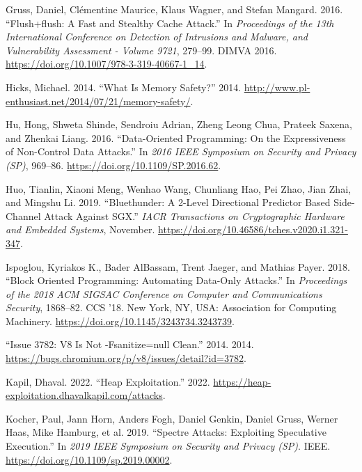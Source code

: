 \documentclass[
  a4paper,
]{report}
\newlength{\cslhangindent}
\newenvironment{CSLReferences}[2] %
{\begin{list}{}{%
	\setlength{\itemindent}{0pt}
	\setlength{\leftmargin}{0pt}
	\setlength{\parsep}{0pt}
	\ifodd #1
	\setlength{\leftmargin}{\cslhangindent}
	\setlength{\itemindent}{-1\cslhangindent}
	\fi
	\setlength{\itemsep}{#2\baselineskip}}}
{\end{list}}
\begin{document}
\begin{CSLReferences}{1}{0}
Gruss, Daniel, Clémentine Maurice, Klaus Wagner, and Stefan Mangard.
2016. {``Flush+flush: A Fast and Stealthy Cache Attack.''} In
\emph{Proceedings of the 13th International Conference on Detection of
Intrusions and Malware, and Vulnerability Assessment - Volume 9721},
279--99. DIMVA 2016. \url{https://doi.org/10.1007/978-3-319-40667-1_14}.

Hicks, Michael. 2014. {``What Is Memory Safety?''} 2014.
\url{http://www.pl-enthusiast.net/2014/07/21/memory-safety/}.

Hu, Hong, Shweta Shinde, Sendroiu Adrian, Zheng Leong Chua, Prateek
Saxena, and Zhenkai Liang. 2016. {``Data-Oriented Programming: On the
Expressiveness of Non-Control Data Attacks.''} In \emph{2016 IEEE
Symposium on Security and Privacy (SP)}, 969--86.
\url{https://doi.org/10.1109/SP.2016.62}.

Huo, Tianlin, Xiaoni Meng, Wenhao Wang, Chunliang Hao, Pei Zhao, Jian
Zhai, and Mingshu Li. 2019. {``Bluethunder: A 2-Level Directional
Predictor Based Side-Channel Attack Against {SGX}.''} \emph{{IACR}
Transactions on Cryptographic Hardware and Embedded Systems}, November.
\url{https://doi.org/10.46586/tches.v2020.i1.321-347}.

Ispoglou, Kyriakos K., Bader AlBassam, Trent Jaeger, and Mathias Payer.
2018. {``Block Oriented Programming: Automating Data-Only Attacks.''} In
\emph{Proceedings of the 2018 ACM SIGSAC Conference on Computer and
Communications Security}, 1868--82. CCS '18. New York, NY, USA:
Association for Computing Machinery.
\url{https://doi.org/10.1145/3243734.3243739}.

{``Issue 3782: V8 Is Not -Fsanitize=null Clean.''} 2014. 2014.
\url{https://bugs.chromium.org/p/v8/issues/detail?id=3782}.

Kapil, Dhaval. 2022. {``Heap Exploitation.''} 2022.
\url{https://heap-exploitation.dhavalkapil.com/attacks}.

Kocher, Paul, Jann Horn, Anders Fogh, Daniel Genkin, Daniel Gruss,
Werner Haas, Mike Hamburg, et al. 2019. {``Spectre Attacks: Exploiting
Speculative Execution.''} In \emph{2019 {IEEE} Symposium on Security and
Privacy ({SP})}. {IEEE}. \url{https://doi.org/10.1109/sp.2019.00002}.


\end{CSLReferences}
\end{document}
